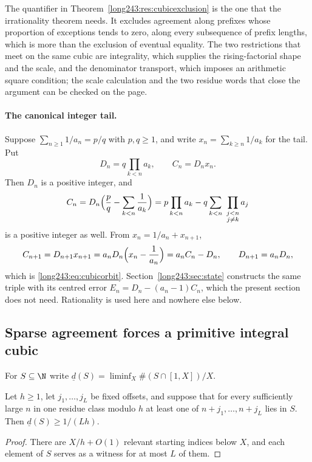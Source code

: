The quantifier in Theorem~\ref{long243:res:cubicexclusion} is the one that the
irrationality theorem needs.  It excludes agreement along prefixes whose
proportion of exceptions tends to zero, along every subsequence of prefix
lengths, which is more than the exclusion of eventual equality.  The two restrictions that meet on
the same cubic are integrality, which supplies the rising-factorial shape and
the scale, and the denominator transport, which imposes an arithmetic square
condition; the scale calculation and the two residue words that close the
argument can be checked on the page.

\paragraph{The canonical integer tail.}
Suppose $\sum_{n\ge1}1/a_n=p/q$ with $p,q\ge1$, and write
$x_n=\sum_{k\ge n}1/a_k$ for the tail.  Put
\[
 D_n=q\prod_{k<n}a_k,\qquad C_n=D_nx_n .
\]
Then $D_n$ is a positive integer, and
\[
 C_n=D_n\Bigl(\frac pq-\sum_{k<n}\frac1{a_k}\Bigr)
    =p\prod_{k<n}a_k-q\sum_{k<n}\ \prod_{\substack{j<n\\ j\ne k}}a_j
\]
is a positive integer as well.  From $x_n=1/a_n+x_{n+1}$,
\[
 C_{n+1}=D_{n+1}x_{n+1}=a_nD_n\Bigl(x_n-\frac1{a_n}\Bigr)=a_nC_n-D_n,
 \qquad D_{n+1}=a_nD_n,
\]
which is \eqref{long243:eq:cubicorbit}.  Section~\ref{long243:sec:state} constructs the same
triple with its centred error $E_n=D_n-(a_n-1)C_n$, which the present section
does not need.  Rationality is used here and nowhere else below.

\subsection{Sparse agreement forces a primitive integral cubic}

For $S\subseteq\N$ write $\underline d(S)=\liminf_X\#(S\cap[1,X])/X$.

\begin{lemma}\label{long243:res:periodicobstruction}
Let $h\ge1$, let $j_1,\ldots,j_L$ be fixed offsets, and suppose that for every
sufficiently large $n$ in one residue class modulo $h$ at least one of
$n+j_1,\ldots,n+j_L$ lies in $S$.  Then $\underline d(S)\ge1/(Lh)$.
\end{lemma}

\begin{proof}
There are $X/h+O(1)$ relevant starting indices below $X$, and each element of
$S$ serves as a witness for at most $L$ of them.
\end{proof}


